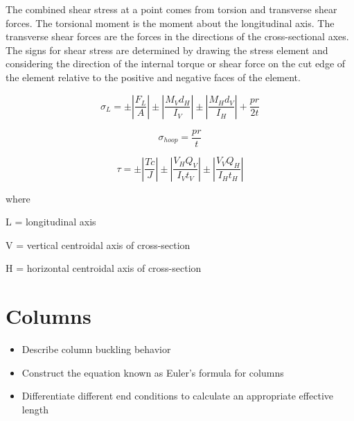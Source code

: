 \documentclass[
  letterpaper,
  DIV=11,
  numbers=noendperiod]{scrreprt}
\providecommand{\tightlist}{%
  \setlength{\itemsep}{0pt}\setlength{\parskip}{0pt}}\usepackage{longtable,booktabs,array}
\theoremstyle{definition}
\theoremstyle{remark}
\begin{document}
\begin{tcolorbox}
The combined shear stress at a point comes from torsion and transverse
shear forces. The torsional moment is the moment about the longitudinal
axis. The transverse shear forces are the forces in the directions of
the cross-sectional axes. The signs for shear stress are determined by
drawing the stress element and considering the direction of the internal
torque or shear force on the cut edge of the element relative to the
positive and negative faces of the element.

\end{tcolorbox}

\begin{tcolorbox}[enhanced jigsaw, leftrule=.75mm, colbacktitle=quarto-callout-note-color!10!white, breakable, opacityback=0, colback=white, titlerule=0mm, toprule=.15mm, colframe=quarto-callout-note-color-frame, coltitle=black, title={Key equations}, toptitle=1mm, bottomrule=.15mm, rightrule=.15mm, left=2mm, arc=.35mm, opacitybacktitle=0.6, bottomtitle=1mm]

\[
\sigma_L= \pm\left|\frac{F_L}{A}\right| \pm\left|\frac{M_V d_H}{I_V}\right| \pm\left|\frac{M_H d_V}{I_H}\right|+\frac{p r}{2 t}
\]

\[
\sigma_{hoop}=\frac{p r}{t}
\]

\[
\tau= \pm\left|\frac{T c}{J}\right| \pm\left|\frac{V_H Q_V}{I_V t_V}\right| \pm\left|\frac{V_V Q_H}{I_H t_H}\right|
\]

where

L = longitudinal axis

V = vertical centroidal axis of cross-section

H = horizontal centroidal axis of cross-section

\end{tcolorbox}


\chapter{Columns}\label{sec-columns}

\begin{tcolorbox}[enhanced jigsaw, leftrule=.75mm, colbacktitle=quarto-callout-note-color!10!white, breakable, opacityback=0, colback=white, titlerule=0mm, toprule=.15mm, colframe=quarto-callout-note-color-frame, coltitle=black, title={Learning Objectives}, toptitle=1mm, bottomrule=.15mm, rightrule=.15mm, left=2mm, arc=.35mm, opacitybacktitle=0.6, bottomtitle=1mm]

\begin{itemize}
\tightlist
\item
  Describe column buckling behavior
\item
  Construct the equation known as Euler's formula for columns
\item
  Differentiate different end conditions to calculate an appropriate
  effective length
\end{itemize}

\end{tcolorbox}
\end{document}

